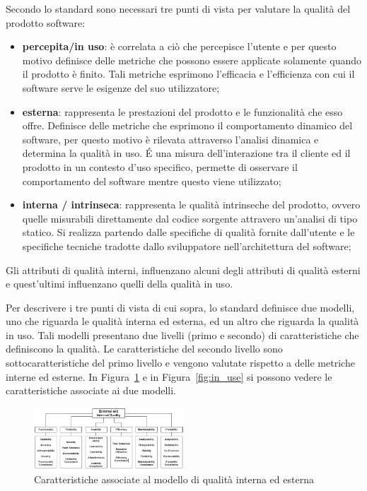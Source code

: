 Secondo lo standard sono necessari tre punti di vista per valutare la qualità del prodotto software:
\begin{itemize}
	\item \textbf{percepita/in uso}: è correlata a ciò che percepisce l'utente e per questo motivo definisce delle metriche che possono essere applicate solamente quando il prodotto è finito. Tali metriche esprimono l'efficacia e l'efficienza con cui il software serve le esigenze del suo utilizzatore;
	 
	\item \textbf{esterna}: rappresenta le prestazioni del prodotto e le funzionalità che esso offre. Definisce delle metriche che esprimono il comportamento dinamico del software, per questo motivo è rilevata attraverso l'analisi dinamica e determina la qualità in uso. É una misura dell'interazione tra il cliente ed il prodotto in un contesto d'uso specifico, permette di osservare il comportamento del software mentre questo viene utilizzato;
	
	\item \textbf{interna / intrinseca}: rappresenta le qualità intrinseche del prodotto, ovvero quelle misurabili direttamente dal codice sorgente attravero un'analisi di tipo statico. Si realizza partendo dalle specifiche di qualità fornite dall'utente e le specifiche tecniche tradotte dallo sviluppatore nell'architettura del software;
\end{itemize}

Gli attributi di qualità interni, influenzano alcuni degli attributi di qualità esterni e quest'ultimi influenzano quelli della qualità in uso.

Per descrivere i tre punti di vista di cui sopra, lo standard definisce due modelli, uno che riguarda le qualità interna ed esterna, ed un altro che riguarda la qualità in uso. Tali modelli presentano due livelli (primo e secondo) di caratteristiche che definiscono la qualità. Le caratteristiche del secondo livello sono sottocaratteristiche del primo livello e vengono valutate rispetto a delle metriche interne ed esterne. In Figura~\ref{fig:int_ext} e in Figura~\ref{fig:in_use} si possono vedere le caratteristiche associate ai due modelli.

\begin{figure}[h!]
	\centering
	\includegraphics[width=0.50\textwidth]{img/int_ext.png}
	\caption{Caratteristiche associate al modello di qualità interna ed esterna}
	\label{fig:int_ext}
\end{figure}

